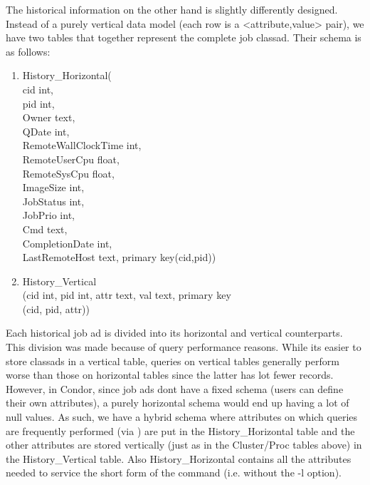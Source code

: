 The historical information on the other hand is slightly differently
designed.  Instead of a purely vertical data model (each row is a
<attribute,value> pair), we have two tables that together represent the
complete job classad.  Their schema is as follows:

\begin{enumerate}

\item History\_Horizontal(\\
        cid                  int,\\
        pid                  int,\\
        Owner                text,\\
        QDate                int,\\
        RemoteWallClockTime  int,\\
        RemoteUserCpu        float,\\
        RemoteSysCpu         float,\\
        ImageSize            int,\\
        JobStatus            int,\\
        JobPrio              int,\\
        Cmd                  text,\\
        CompletionDate       int,\\
        LastRemoteHost       text,
        primary key(cid,pid))

\item History\_Vertical\\
	(cid int, pid int, attr text, val text, primary key\\
	(cid, pid, attr))

\end{enumerate}

Each historical job ad is divided into its horizontal and vertical
counterparts.  This division was made because of query performance
reasons.  While its easier to store classads in a vertical table, queries
on vertical tables generally perform worse than those on horizontal
tables since the latter has lot fewer records.  However, in Condor,
since job ads dont have a fixed schema (users can define their own
attributes), a purely horizontal schema would end up having a lot of
null values. As such, we have a hybrid schema where attributes on which
queries are frequently performed (via ) are put in the
History\_Horizontal table and the other attributes are stored vertically
(just as in the Cluster/Proc tables above) in the History\_Vertical
table. Also History\_Horizontal contains all the attributes needed to
service the short form of the  command (i.e. without
the -l option).

